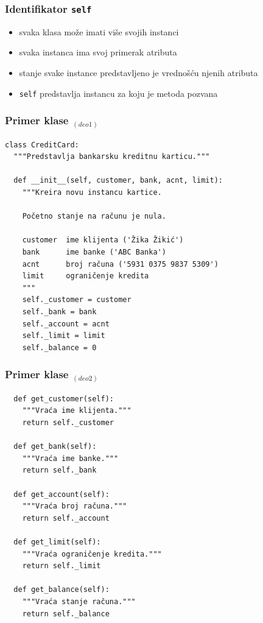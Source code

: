 \documentclass[compress]{beamer}
\begin{document}
\begin{frame}[fragile]
  \frametitle{Identifikator \texttt{self}}
  \begin{itemize}
    \item svaka klasa može imati više svojih instanci
    \item svaka instanca ima svoj primerak atributa
    \item stanje svake instance predstavljeno je vrednošću njenih atributa
    \item \texttt{self} predstavlja instancu za koju je metoda pozvana 
  \end{itemize}
\end{frame}

\begin{frame}[fragile,shrink=10]
  \frametitle{Primer klase $_{(deo 1)}$}
\begin{verbatim}
class CreditCard:
  """Predstavlja bankarsku kreditnu karticu."""
  
  def __init__(self, customer, bank, acnt, limit):
    """Kreira novu instancu kartice.
    
    Početno stanje na računu je nula.
    
    customer  ime klijenta ('Žika Žikić')
    bank      ime banke ('ABC Banka')
    acnt      broj računa ('5931 0375 9837 5309')
    limit     ograničenje kredita
    """
    self._customer = customer
    self._bank = bank
    self._account = acnt
    self._limit = limit
    self._balance = 0
\end{verbatim}
\end{frame}

\begin{frame}[fragile,shrink=10]
  \frametitle{Primer klase $_{(deo 2)}$}
\begin{verbatim}
  def get_customer(self):
    """Vraća ime klijenta."""
    return self._customer

  def get_bank(self):
    """Vraća ime banke."""
    return self._bank

  def get_account(self):
    """Vraća broj računa."""
    return self._account

  def get_limit(self):
    """Vraća ograničenje kredita."""
    return self._limit

  def get_balance(self):
    """Vraća stanje računa."""
    return self._balance
\end{verbatim}
\end{frame}
\end{document}
